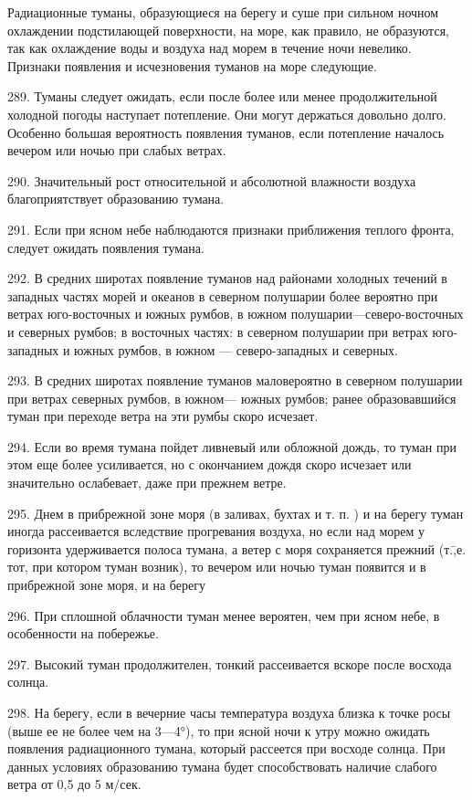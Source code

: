 Радиационные туманы, образующиеся на берегу и суше при сильном ночном охлаждении подстилающей поверхности, на море, как правило, не образуются, так как охлаждение воды и воздуха над морем в течение ночи невелико. Признаки появления и исчезновения туманов на море следующие.

289. Туманы следует ожидать, если после более или менее продолжительной холодной погоды наступает потепление. Они могут держаться довольно долго. Особенно большая вероятность появления туманов, если потепление началось вечером или ночью при слабых ветрах.

290. Значительный рост относительной и абсолютной влажности воздуха благоприятствует образованию тумана.

291. Если при ясном небе наблюдаются признаки приближения теплого фронта, следует ожидать появления тумана.

292. В средних широтах появление туманов над районами холодных течений в западных частях морей и океанов в северном полушарии более вероятно при ветрах юго-восточных и южных румбов, в южном полушарии—северо-восточных и северных румбов; в восточных частях: в северном полушарии при ветрах юго-западных и южных румбов, в южном — северо-западных и северных.

293. В средних широтах появление туманов маловероятно в северном полушарии при ветрах северных румбов, в южном— южных румбов; ранее образовавшийся туман при переходе ветра на эти румбы скоро исчезает.

294. Если во время тумана пойдет ливневый или обложной дождь, то туман при этом еще более усиливается, но с окончанием дождя скоро исчезает или значительно ослабевает, даже при прежнем ветре.

295. Днем в прибрежной зоне моря (в заливах, бухтах и т. п. ) и на берегу туман иногда рассеивается вследствие прогревания воздуха, но если над морем у горизонта удерживается полоса тумана, а ветер с моря сохраняется прежний (т.\=,е. тот, при котором туман возник), то вечером или ночью туман появится и в прибрежной зоне моря, и на берегу

296. При сплошной облачности туман менее вероятен, чем при ясном небе, в особенности на побережье.

297. Высокий туман продолжителен, тонкий рассеивается вскоре после восхода солнца.

298. На берегу, если в вечерние часы температура воздуха близка к точке росы (выше ее не более чем на 3—4°), то при ясной ночи к утру можно ожидать появления радиационного тумана, который рассеется при восходе солнца. При данных условиях образованию тумана будет способствовать наличие слабого ветра от 0,5 до 5 м/сек.

